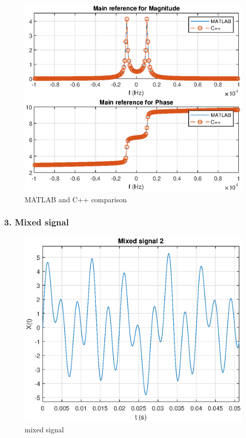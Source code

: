 \begin{refsection}
\begin{figure}[h]
	\centering
	\includegraphics[width=12cm]{./algorithms/fft/figures/Single_sinusoid_fft.eps}
	\caption{MATLAB and C++ comparison}\label{Single_sinusoid_fft}
\end{figure}

\newpage
\subsubsection{3. Mixed signal}

\begin{figure}[h]
	\centering
	\includegraphics[width=12cm]{./algorithms/fft/figures/mixed_signal.eps}
	\caption{mixed signal}\label{mixed_signal}
\end{figure}


\end{refsection}
